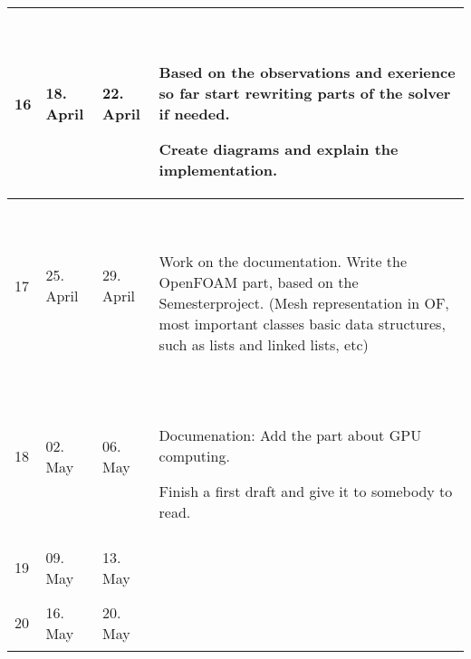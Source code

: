 \documentclass[
  a4wide,
  smallheadings
]{article}
\begin{document}
\begin{supertabular}{|p{1.5cm}|p{2cm}|p{2cm}|p{8cm}|}
    \hline
    
    16 & 18. April & 22. April &
    
     \begin{compactitem}
        \item Based on the observations and exerience so far start rewriting
              parts of the solver if needed.
        \item Create diagrams and explain the implementation.
    \end{compactitem} \\
    
    \hline
    
    17 & 25. April & 29. April &
    
     \begin{compactitem}
        \item Work on the documentation. Write the OpenFOAM part, based on the 
              Semesterproject. (Mesh representation in OF, most important classes
              basic data structures, such as lists and linked lists, etc)
    \end{compactitem} \\
    
    \hline
    
    18 & 02. May & 06. May &
    
     \begin{compactitem}
        \item Documenation: Add the part about GPU computing.
        \item Finish a first draft and give it to somebody to read.
    \end{compactitem} \\
    
    \hline
    
    19 & 09. May & 13. May &
    
     \begin{compactitem}
        \item 
    \end{compactitem} \\
    
    \hline
    
    20 & 16. May & 20. May &
    
     \begin{compactitem}
        \item
    \end{compactitem} \\
    
    \hline
    

\end{supertabular}
\end{document}
